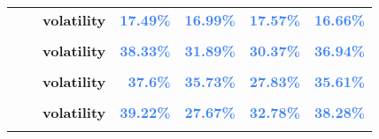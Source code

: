 \documentclass[
  authoryear,
  preprint,
  3p]{elsarticle}
\begin{document}
\begin{longtable}[t]{>{}l>{}l>{}l>{}r>{}r>{}r>{}r}
\textbf{} & \textbf{} & \textbf{volatility} & \textcolor[HTML]{4285f4}{\textbf{17.49\%}} & \textcolor[HTML]{4285f4}{\textbf{16.99\%}} & \textcolor[HTML]{4285f4}{\textbf{17.57\%}} & \textcolor[HTML]{4285f4}{\textbf{16.66\%}}\\
\textbf{\cellcolor{gray!10}{Lean hogs (XCME)}} & \textbf{\cellcolor{gray!10}{whole period}} & \textbf{\cellcolor{gray!10}{mean}} & \textcolor[HTML]{4285f4}{\textbf{\cellcolor{gray!10}{0.73\%}}} & \textcolor[HTML]{4285f4}{\textbf{\cellcolor{gray!10}{8.4\%}}} & \textcolor[HTML]{4285f4}{\textbf{\cellcolor{gray!10}{12.69\%}}} & \textcolor[HTML]{4285f4}{\textbf{\cellcolor{gray!10}{-1.09\%}}}\\
\textbf{} & \textbf{} & \textbf{volatility} & \textcolor[HTML]{4285f4}{\textbf{38.33\%}} & \textcolor[HTML]{4285f4}{\textbf{31.89\%}} & \textcolor[HTML]{4285f4}{\textbf{30.37\%}} & \textcolor[HTML]{4285f4}{\textbf{36.94\%}}\\
\addlinespace
\textbf{\cellcolor{gray!10}{}} & \textbf{\cellcolor{gray!10}{backwardation}} & \textbf{\cellcolor{gray!10}{mean}} & \textcolor[HTML]{4285f4}{\textbf{\cellcolor{gray!10}{12.34\%}}} & \textcolor[HTML]{4285f4}{\textbf{\cellcolor{gray!10}{16.3\%}}} & \textcolor[HTML]{4285f4}{\textbf{\cellcolor{gray!10}{18.23\%}}} & \textcolor[HTML]{4285f4}{\textbf{\cellcolor{gray!10}{19.24\%}}}\\
\textbf{} & \textbf{} & \textbf{volatility} & \textcolor[HTML]{4285f4}{\textbf{37.6\%}} & \textcolor[HTML]{4285f4}{\textbf{35.73\%}} & \textcolor[HTML]{4285f4}{\textbf{27.83\%}} & \textcolor[HTML]{4285f4}{\textbf{35.61\%}}\\
\textbf{\cellcolor{gray!10}{}} & \textbf{\cellcolor{gray!10}{contango}} & \textbf{\cellcolor{gray!10}{mean}} & \textcolor[HTML]{4285f4}{\textbf{\cellcolor{gray!10}{-10.5\%}}} & \textcolor[HTML]{4285f4}{\textbf{\cellcolor{gray!10}{0.6\%}}} & \textcolor[HTML]{4285f4}{\textbf{\cellcolor{gray!10}{7.5\%}}} & \textcolor[HTML]{4285f4}{\textbf{\cellcolor{gray!10}{-20.66\%}}}\\
\textbf{} & \textbf{} & \textbf{volatility} & \textcolor[HTML]{4285f4}{\textbf{39.22\%}} & \textcolor[HTML]{4285f4}{\textbf{27.67\%}} & \textcolor[HTML]{4285f4}{\textbf{32.78\%}} & \textcolor[HTML]{4285f4}{\textbf{38.28\%}}\\
\textbf{\cellcolor{gray!10}{Cocoa (IFUS)}} & \textbf{\cellcolor{gray!10}{whole period}} & \textbf{\cellcolor{gray!10}{mean}} & \textcolor[HTML]{4285f4}{\textbf{\cellcolor{gray!10}{3.66\%}}} & \textcolor[HTML]{4285f4}{\textbf{\cellcolor{gray!10}{16.35\%}}} & \textcolor[HTML]{4285f4}{\textbf{\cellcolor{gray!10}{1.39\%}}} & \textcolor[HTML]{4285f4}{\textbf{\cellcolor{gray!10}{3.65\%}}}\\

\end{longtable}
\end{document}
